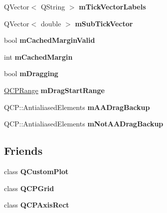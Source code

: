 \begin{DoxyCompactItemize}
Q\+Vector$<$ Q\+String $>$ {\bfseries m\+Tick\+Vector\+Labels}
\item 
\mbox{\label{classQCPAxis_a28353081e0ff35c3fe5ced923a287faa}} 
Q\+Vector$<$ double $>$ {\bfseries m\+Sub\+Tick\+Vector}
\item 
\mbox{\label{classQCPAxis_a2cde37b6e385f47e11322df4ac1b0e9b}} 
bool {\bfseries m\+Cached\+Margin\+Valid}
\item 
\mbox{\label{classQCPAxis_a48ace55cbd54f7241e7f1b06fd369b64}} 
int {\bfseries m\+Cached\+Margin}
\item 
\mbox{\label{classQCPAxis_ad56b9be14ed8ae9b858d84bdb539b1ca}} 
bool {\bfseries m\+Dragging}
\item 
\mbox{\label{classQCPAxis_a4b665f97d37727f0013b93d727e80bd2}} 
\hyperlink{classQCPRange}{Q\+C\+P\+Range} {\bfseries m\+Drag\+Start\+Range}
\item 
\mbox{\label{classQCPAxis_a9c34e6f92eda5803e7ce4ea3322a6417}} 
Q\+C\+P\+::\+Antialiased\+Elements {\bfseries m\+A\+A\+Drag\+Backup}
\item 
\mbox{\label{classQCPAxis_a0be1bc05fcbf86bd9916cc8faa55dd78}} 
Q\+C\+P\+::\+Antialiased\+Elements {\bfseries m\+Not\+A\+A\+Drag\+Backup}
\end{DoxyCompactItemize}
\subsection*{Friends}
\begin{DoxyCompactItemize}
\item 
\mbox{\label{classQCPAxis_a1cdf9df76adcfae45261690aa0ca2198}} 
class {\bfseries Q\+Custom\+Plot}
\item 
\mbox{\label{classQCPAxis_a061e177f585549fc31f780852e2bd6fe}} 
class {\bfseries Q\+C\+P\+Grid}
\item 
\mbox{\label{classQCPAxis_acbf20ecb140f66c5fd1bc64ae0762990}} 
class {\bfseries Q\+C\+P\+Axis\+Rect}
\end{DoxyCompactItemize}


